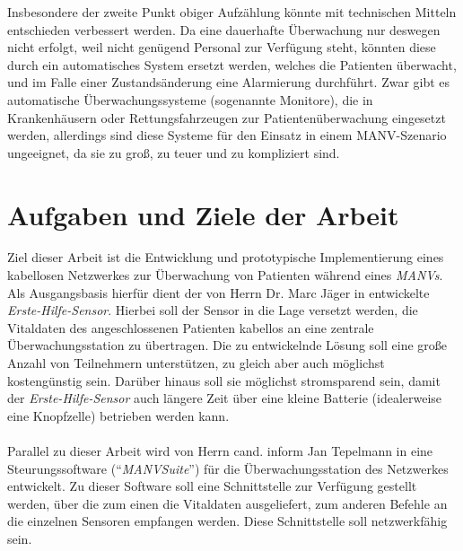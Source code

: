 Insbesondere der zweite Punkt obiger Aufzählung könnte mit technischen Mitteln entschieden
verbessert werden. Da eine dauerhafte Überwachung nur deswegen nicht erfolgt, weil nicht genügend
Personal zur Verfügung steht, könnten diese durch ein automatisches System ersetzt werden, welches
die Patienten überwacht, und im Falle einer Zustandsänderung eine Alarmierung durchführt.
Zwar gibt es automatische Überwachungssysteme (sogenannte Monitore), die in Krankenhäusern oder
Rettungsfahrzeugen zur Patientenüberwachung eingesetzt werden, allerdings sind diese Systeme für
den Einsatz in einem MANV-Szenario ungeeignet, da sie zu groß, zu teuer und zu kompliziert sind.

\section{Aufgaben und Ziele der Arbeit}
Ziel dieser Arbeit ist die Entwicklung und prototypische Implementierung eines
kabellosen Netzwerkes zur Überwachung von Patienten während eines \emph{MANVs}. Als
Ausgangsbasis hierfür dient der von Herrn Dr. Marc Jäger in \cite{Marc}
entwickelte \emph{Erste-Hilfe-Sensor}. Hierbei soll der Sensor in die Lage versetzt
werden, die Vitaldaten des angeschlossenen Patienten kabellos an eine zentrale
Überwachungsstation zu übertragen. Die zu entwickelnde Lösung soll eine
große Anzahl von Teilnehmern unterstützen, zu gleich aber auch möglichst kostengünstig
sein. Darüber hinaus soll sie möglichst stromsparend sein, damit der \emph{Erste-Hilfe-Sensor}
auch längere Zeit über eine kleine Batterie (idealerweise eine Knopfzelle) betrieben 
werden kann.\\
\\
Parallel zu dieser Arbeit wird von Herrn cand. inform Jan Tepelmann in \cite{Jan} eine 
Steurungssoftware ("`\emph{MANVSuite}"') für die Überwachungsstation des Netzwerkes 
entwickelt. Zu dieser Software soll eine Schnittstelle zur Verfügung gestellt werden, über die zum einen
die Vitaldaten ausgeliefert, zum anderen Befehle an die einzelnen Sensoren empfangen 
werden. Diese Schnittstelle soll netzwerkfähig sein. 

